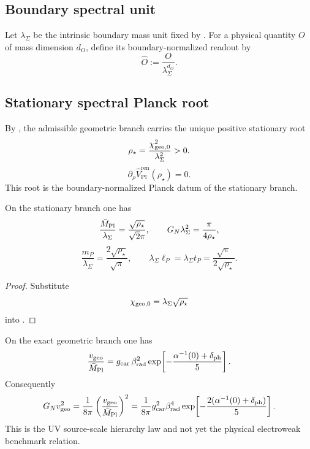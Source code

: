 \subsection{Boundary spectral unit}

\begin{definition}
\label{def:boundary-spectral-unit}
Let $\lambda_\Sigma$ be the intrinsic boundary mass unit fixed by
. For a physical quantity $O$ of mass dimension $d_O$,
define its boundary-normalized readout by
\[
\widehat O:=\frac{O}{\lambda_\Sigma^{d_O}}.
\]
\end{definition}

\subsection{Stationary spectral Planck root}

\begin{corollary}
\label{thm:unique-stationary-spectral-planck-root}
By , the admissible geometric branch carries the unique
positive stationary root
\[
\rho_\star=\frac{\chi_{\mathrm{geo},0}^2}{\lambda_\Sigma^2}>0.
\]
\[
\partial_\rho\widehat V_{\mathrm{Pl}}^{\mathrm{ren}}(\rho_\star)=0.
\]
This root is the boundary-normalized Planck datum of the stationary branch.
\end{corollary}

\begin{corollary}
\label{cor:dimensionless-planck-metrology}
On the stationary branch one has
\[
\frac{\bar M_{\mathrm{Pl}}}{\lambda_\Sigma}
=
\frac{\sqrt{\rho_\star}}{\sqrt2\pi},
\qquad
G_N\lambda_\Sigma^2
=
\frac{\pi}{4\rho_\star},
\]
\[
\frac{m_P}{\lambda_\Sigma}
=
\frac{2\sqrt{\rho_\star}}{\sqrt\pi},
\qquad
\lambda_\Sigma\ell_P=\lambda_\Sigma t_P
=
\frac{\sqrt\pi}{2\sqrt{\rho_\star}}.
\]
\end{corollary}

\begin{proof}
Substitute
\[
\chi_{\mathrm{geo},0}=\lambda_\Sigma\sqrt{\rho_\star}
\]
into .
\end{proof}

\begin{corollary}
\label{cor:dimensionless-geometric-hierarchy}
On the exact geometric branch one has
\[
\frac{v_{\mathrm{geo}}}{\bar M_{\mathrm{Pl}}}
=
g_{\mathrm{car}}\,\beta_{\mathrm{rad}}^2
\exp\!\left[-\frac{\alpha^{-1}(0)+\delta_{\mathrm{ph}}}{5}\right].
\]
Consequently
\[
G_Nv_{\mathrm{geo}}^2
=
\frac{1}{8\pi}
\left(\frac{v_{\mathrm{geo}}}{\bar M_{\mathrm{Pl}}}\right)^2
=
\frac{1}{8\pi}g_{\mathrm{car}}^2\beta_{\mathrm{rad}}^4
\exp\!\left[-\frac{2(\alpha^{-1}(0)+\delta_{\mathrm{ph}})}{5}\right].
\]
This is the UV source-scale hierarchy law and not yet the physical electroweak benchmark relation.
\end{corollary}

